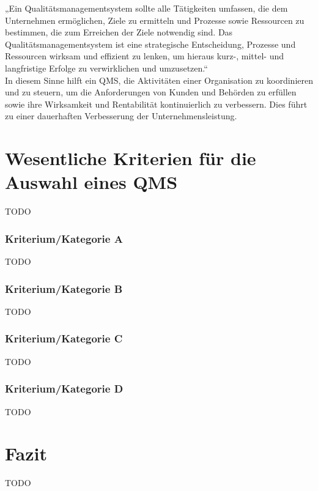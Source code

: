 \documentclass[11pt]{scrartcl}       %
\begin{document}
    „Ein Qualitätsmanagementsystem sollte alle Tätigkeiten umfassen, die dem Unternehmen ermöglichen, Ziele zu ermitteln und Prozesse sowie Ressourcen zu bestimmen, die zum Erreichen der Ziele notwendig sind. Das Qualitätsmanagementsystem ist eine strategische Entscheidung, Prozesse und Ressourcen wirksam und effizient zu lenken, um hieraus kurz-, mittel- und langfristige Erfolge zu verwirklichen und umzusetzen.“ \cite{mai2020grundlage} \\

In diesem Sinne hilft ein QMS, die Aktivitäten einer Organisation zu koordinieren und zu steuern, um die Anforderungen von Kunden und Behörden zu erfüllen sowie ihre Wirksamkeit und Rentabilität kontinuierlich zu verbessern. Dies führt zu einer dauerhaften Verbesserung der Unternehmensleistung. 


\section{Wesentliche Kriterien für die Auswahl eines QMS}

TODO

\subsubsection{Kriterium/Kategorie A}

TODO



\subsubsection{Kriterium/Kategorie B}

TODO



\subsubsection{Kriterium/Kategorie C}

 TODO



\subsubsection{Kriterium/Kategorie D}

 TODO



\section{Fazit}

 TODO



\newpage
{}
{}
\nocite{*}
\printbibliography
\end{document}
